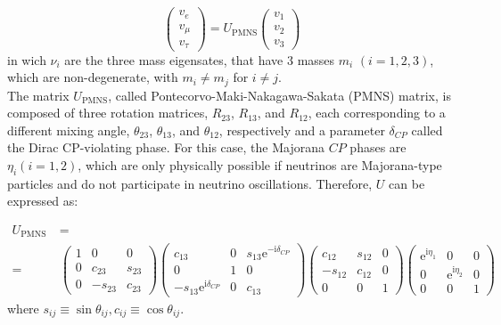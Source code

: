 \begin{equation*}
	\left(\begin{array}{l}
		v_e \\
		v_\mu \\
		v_\tau
	\end{array}\right)=U_{\mathrm{PMNS}}\left(\begin{array}{l}
		v_1 \\
		v_2 \\
		v_3
	\end{array}\right)
\end{equation*}
in wich $\nu_i$ are the three mass eigensates, that have 3 masses  $m_i$  $(i = 1,2,3)$, which are non-degenerate, with $m_i \neq m_j$ for $i \neq j$.\\

The matrix $U_{\mathrm{PMNS}}$, called Pontecorvo-Maki-Nakagawa-Sakata (PMNS) matrix, is composed of three rotation matrices, $R_{23}$, $R_{13}$, and $R_{12}$, each corresponding to a different mixing angle, $\theta_{23}$, $\theta_{13}$, and $\theta_{12}$, respectively and a parameter $\delta_{CP}$ called the Dirac CP-violating phase. For this case, the Majorana $C P$ phases are $\eta_i(i=1,2)$, which are only physically possible if neutrinos are Majorana-type particles and do not participate in neutrino oscillations. Therefore, $U$ can be expressed as:

\begin{equation*} 
	\begin{split}
			U_{\text {PMNS }}&=\\
		=&\left(\begin{array}{ccc}
			1 & 0 & 0 \\
			0 & c_{23} & s_{23} \\
			0 & -s_{23} & c_{23}
		\end{array}\right) \left(\begin{array}{ccc}
			c_{13} & 0 & s_{13} \mathrm{e}^{-\mathrm{i} \delta_{C P}} \\
			0 & 1 & 0 \\
			-s_{13} \mathrm{e}^{\mathrm{i} \delta_{C P}} & 0 & c_{13}
		\end{array}\right) 
		\left(\begin{array}{ccc}
			c_{12} & s_{12} & 0 \\
			-s_{12} & c_{12} & 0 \\
			0 & 0 & 1
		\end{array}\right)\left(\begin{array}{ccc}
			\mathrm{e}^{\mathrm{i} \eta_1} & 0 & 0 \\
			0 & \mathrm{e}^{\mathrm{i} \eta_2} & 0 \\
			0 & 0 & 1
		\end{array}\right)
	\end{split}
\end{equation*}
where $s_{i j} \equiv \sin \theta_{i j}, c_{i j} \equiv \cos \theta_{i j}$.

